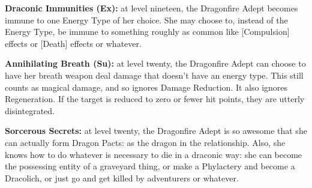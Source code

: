 \textbf{Draconic Immunities (Ex):} at level nineteen, the Dragonfire Adept becomes immune to one Energy Type of her choice. She may choose to, instead of the Energy Type, be immune to something roughly as common like [Compulsion] effects or [Death] effects or whatever.

\textbf{Annihilating Breath (Su):} at level twenty, the Dragonfire Adept can choose to have her breath weapon deal damage that doesn't have an energy type. This still counts as magical damage, and so ignores Damage Reduction. It also ignores Regeneration. If the target is reduced to zero or fewer hit points, they are utterly disintegrated.

\textbf{Sorcerous Secrets:} at level twenty, the Dragonfire Adept is so awesome that she can actually form Dragon Pacts: as the dragon in the relationship. Also, she knows how to do whatever is necessary to die in a draconic way: she can become the possessing entity of a graveyard thing, or make a Phylactery and become a Dracolich, or just go and get killed by adventurers or whatever.